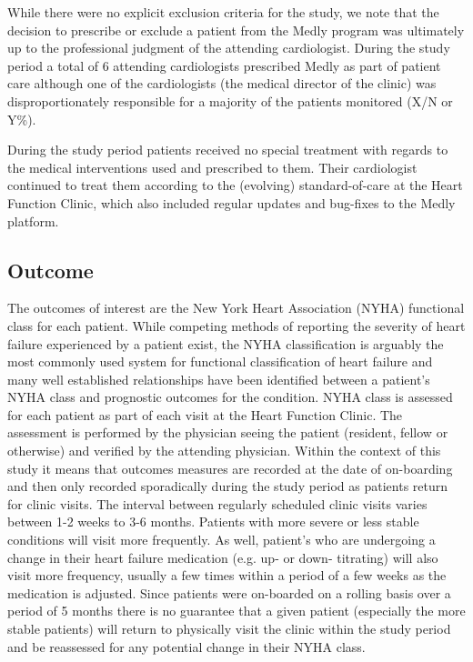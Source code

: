 \documentclass[]{article}
\begin{document}
While there were no explicit exclusion criteria for the study, we note that the decision to prescribe or exclude a patient from the Medly program was ultimately up to the professional judgment of the attending cardiologist. During the study period a total of 6 attending cardiologists prescribed Medly as part of patient care although one of the cardiologists (the medical director of the clinic) was disproportionately responsible for a majority of the patients monitored (X/N or Y\%).

During the study period patients received no special treatment with regards to the medical interventions used and prescribed to them. Their cardiologist continued to treat them according to the (evolving) standard-of-care at the Heart Function Clinic, which also included regular updates and bug-fixes to the Medly platform. %

\subsection{Outcome} %

The outcomes of interest are the New York Heart Association (NYHA) functional class for each patient. While competing methods of reporting the severity of heart failure experienced by a patient exist, the NYHA classification is arguably the most commonly used system for functional classification of heart failure and many well established relationships have been identified between a patient's NYHA class and prognostic outcomes for the condition. NYHA class is assessed for each patient as part of each visit at the Heart Function Clinic. The assessment is performed by the physician seeing the patient (resident, fellow or otherwise) and verified by the attending physician. Within the context of this study it means that outcomes measures are recorded at the date of on-boarding and then only recorded sporadically during the study period as patients return for clinic visits. The interval between regularly scheduled clinic visits varies between 1-2 weeks to 3-6 months. Patients with more severe or less stable conditions will visit more frequently. As well, patient's who are undergoing a change in their heart failure medication (e.g. up- or down- titrating) will also visit more frequency, usually a few times within a period of a few weeks as the medication is adjusted. Since patients were on-boarded on a rolling basis over a period of 5 months there is no guarantee that a given patient (especially the more stable patients) will return to physically visit the clinic within the study period and be reassessed for any potential change in their NYHA class. %
\end{document}
